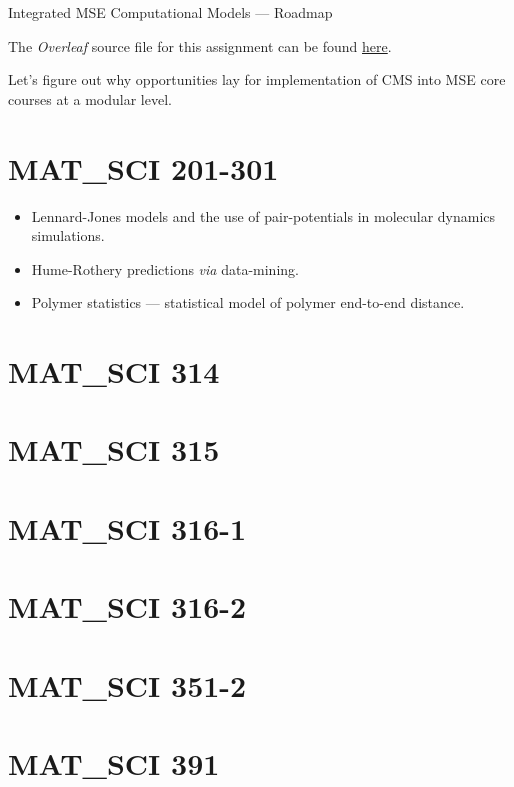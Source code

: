 \documentclass[12pt]{exam}
\begin{document}
			
{\Large \textcolor{NUpurp120}{Integrated MSE Computational Models --- Roadmap}}

The \textit{Overleaf} source file for this assignment can be found \href{https://www.overleaf.com/project/5d38641245f8bc723f3e7708}{here}.
\vspace{2em}

Let's figure out why opportunities lay for implementation of CMS into MSE core courses at a modular level.

\newpage
\section{\selectfont MAT\_SCI 201-301}

\begin{itemize}
    \item Lennard-Jones models and the use of pair-potentials in molecular dynamics simulations.
    \item Hume-Rothery predictions \textit{via} data-mining.
    \item Polymer statistics --- statistical model of polymer end-to-end distance.
\end{itemize}

\newpage
\section{MAT\_SCI 314}

\newpage
\section{MAT\_SCI 315}

\newpage
\section{MAT\_SCI 316-1}

\newpage
\section{MAT\_SCI 316-2}

\newpage
\section{MAT\_SCI 351-2}

\newpage
\section{MAT\_SCI 391}
\end{document}
